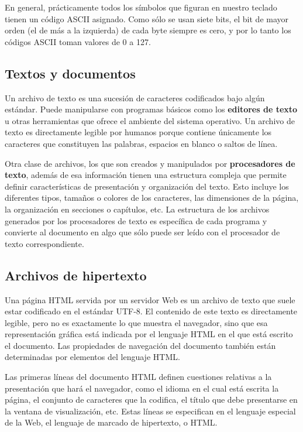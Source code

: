 \documentclass[spanish,a4paper,]{article}
\begin{document}
En general, prácticamente todos los símbolos que figuran en nuestro
teclado tienen un código ASCII asignado. Como sólo se usan siete bits,
el bit de mayor orden (el de más a la izquierda) de cada byte siempre es
cero, y por lo tanto los códigos ASCII toman valores de 0 a 127.

\hypertarget{textos-y-documentos}{%
\subsection{Textos y documentos}\label{textos-y-documentos}}

Un archivo de texto es una sucesión de caracteres codificados bajo algún
estándar. Puede manipularse con programas básicos como los
\textbf{editores de texto} u otras herramientas que ofrece el ambiente
del sistema operativo. Un archivo de texto es directamente legible por
humanos porque contiene únicamente los caracteres que constituyen las
palabras, espacios en blanco o saltos de línea.

Otra clase de archivos, los que son creados y manipulados por
\textbf{procesadores de texto}, además de esa información tienen una
estructura compleja que permite definir características de presentación
y organización del texto. Esto incluye los diferentes tipos, tamaños o
colores de los caracteres, las dimensiones de la página, la organización
en secciones o capítulos, etc. La estructura de los archivos generados
por los procesadores de texto es específica de cada programa y convierte
al documento en algo que sólo puede ser leído con el procesador de texto
correspondiente.

\hypertarget{archivos-de-hipertexto}{%
\subsection{Archivos de hipertexto}\label{archivos-de-hipertexto}}

Una página HTML servida por un servidor Web es un archivo de texto que
suele estar codificado en el estándar UTF-8. El contenido de este texto
es directamente legible, pero no es exactamente lo que muestra el
navegador, sino que esa representación gráfica está indicada por el
lenguaje HTML en el que está escrito el documento. Las propiedades de
navegación del documento también están determinadas por elementos del
lenguaje HTML.

Las primeras líneas del documento HTML definen cuestiones relativas a la
presentación que hará el navegador, como el idioma en el cual está
escrita la página, el conjunto de caracteres que la codifica, el título
que debe presentarse en la ventana de visualización, etc. Estas líneas
se especifican en el lenguaje especial de la Web, el lenguaje de marcado
de hipertexto, o HTML.
\end{document}
